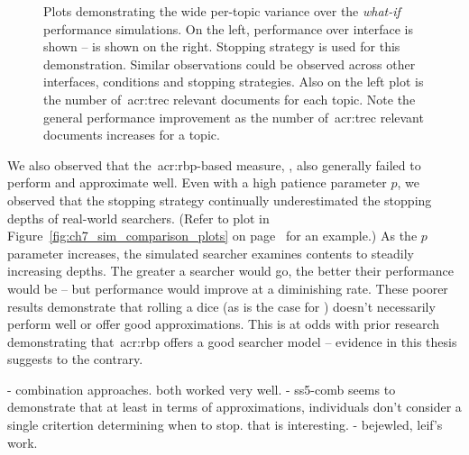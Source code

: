 \begin{figure}[t!]
    \centering
    \caption[Per-topic performance variation example]{Plots demonstrating the wide per-topic variance over the \emph{what-if} performance simulations. On the left, performance over interface  is shown –  is shown on the right. Stopping strategy  is used for this demonstration. Similar observations could be observed across other interfaces, conditions and stopping strategies. Also  on the left plot is the number of~\gls{acr:trec} relevant documents for each topic. Note the general performance improvement as the number of~\gls{acr:trec} relevant documents increases for a topic.}
    \label{fig:per_topic_differences}
\end{figure}

We also observed that the~\gls{acr:rbp}-based measure, , also generally failed to perform and approximate well. Even with a high patience parameter $p$, we observed that the stopping strategy continually underestimated the stopping depths of real-world searchers. (Refer to plot  in Figure~\ref{fig:ch7_sim_comparison_plots} on page~\pageref{fig:ch7_sim_comparison_plots} for an example.) As the $p$ parameter increases, the simulated searcher examines contents to steadily increasing depths. The greater a searcher would go, the better their performance would be -- but performance would improve at a diminishing rate. These poorer results demonstrate that rolling a dice (as is the case for ) doesn't necessarily perform well or offer good approximations. This is at odds with prior research demonstrating that~\gls{acr:rbp} offers a good searcher model -- evidence in this thesis suggests to the contrary.


\todo{=====}

- combination approaches. both worked very well.
    - ss5-comb seems to demonstrate that at least in terms of approximations, individuals don't consider a single critertion determining when to stop. that is interesting.
        - bejewled, leif's work.
    
